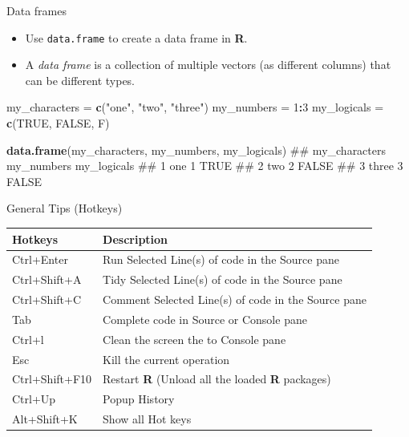 \documentclass[ignorenonframetext,]{beamer}
\newenvironment{Shaded}{\begin{snugshade}}{\end{snugshade}}
\newcommand{\KeywordTok}[1]{\textcolor[rgb]{0.13,0.29,0.53}{\textbf{#1}}}
\newcommand{\DecValTok}[1]{\textcolor[rgb]{0.00,0.00,0.81}{#1}}
\newcommand{\StringTok}[1]{\textcolor[rgb]{0.31,0.60,0.02}{#1}}
\newcommand{\OtherTok}[1]{\textcolor[rgb]{0.56,0.35,0.01}{#1}}
\newcommand{\OperatorTok}[1]{\textcolor[rgb]{0.81,0.36,0.00}{\textbf{#1}}}
\newcommand{\NormalTok}[1]{#1}
\providecommand{\tightlist}{%
  \setlength{\itemsep}{0pt}\setlength{\parskip}{0pt}}
\let\oldShaded\Shaded
\let\endoldShaded\endShaded
\renewenvironment{Shaded}{\footnotesize\oldShaded}{\endoldShaded}
\begin{document}
\begin{frame}[fragile]{Data frames}

\begin{itemize}
\tightlist
\item
  Use \texttt{data.frame} to create a data frame in \textbf{R}.
\item
  A \emph{data frame} is a collection of multiple vectors (as different
  columns) that can be different types.
\end{itemize}

\begin{Shaded}
\begin{Highlighting}[]
\NormalTok{my_characters =}\StringTok{ }\KeywordTok{c}\NormalTok{(}\StringTok{"one"}\NormalTok{, }\StringTok{"two"}\NormalTok{, }\StringTok{"three"}\NormalTok{)}
\NormalTok{my_numbers =}\StringTok{ }\DecValTok{1}\OperatorTok{:}\DecValTok{3}
\NormalTok{my_logicals =}\StringTok{ }\KeywordTok{c}\NormalTok{(}\OtherTok{TRUE}\NormalTok{, }\OtherTok{FALSE}\NormalTok{, F)}

\KeywordTok{data.frame}\NormalTok{(my_characters, my_numbers, my_logicals)}
\NormalTok{##   my_characters my_numbers my_logicals}
\NormalTok{## 1           one          1        TRUE}
\NormalTok{## 2           two          2       FALSE}
\NormalTok{## 3         three          3       FALSE}
\end{Highlighting}
\end{Shaded}

\end{frame}

\begin{frame}{General Tips (Hotkeys)}

\begin{longtable}[]{@{}ll@{}}
\toprule
Hotkeys & Description\tabularnewline
\midrule
\endhead
Ctrl+Enter & Run Selected Line(s) of code in the Source
pane\tabularnewline
Ctrl+Shift+A & Tidy Selected Line(s) of code in the Source
pane\tabularnewline
Ctrl+Shift+C & Comment Selected Line(s) of code in the Source
pane\tabularnewline
Tab & Complete code in Source or Console pane\tabularnewline
Ctrl+l & Clean the screen the to Console pane\tabularnewline
Esc & Kill the current operation\tabularnewline
Ctrl+Shift+F10 & Restart \textbf{R} (Unload all the loaded \textbf{R}
packages)\tabularnewline
Ctrl+Up & Popup History\tabularnewline
Alt+Shift+K & Show all Hot keys\tabularnewline
\bottomrule
\end{longtable}

\end{frame}
\end{document}
